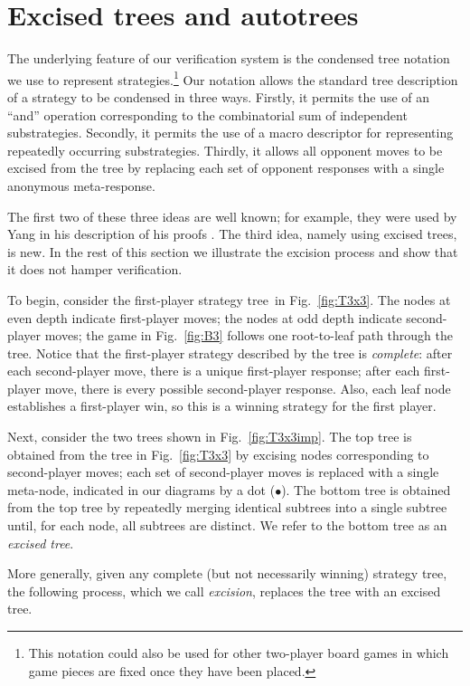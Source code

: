 \documentclass{llncs}
\def\at{autotree}
\def\stt{strategy tree}
\def\exct{excised tree}
\def\Exct{Excised tree}
\begin{document}
\section{\Exct s and \at s}
The underlying feature of our verification system is
the condensed tree notation we use to represent strategies.\footnote{This 
  notation could also be used for other two-player board games
  in which game pieces are fixed once they have been placed.}
Our notation allows the standard tree description 
of a strategy to be condensed in three ways.
Firstly, it permits the use of an ``and'' operation
corresponding to the combinatorial sum of independent substrategies.
Secondly, it permits the use of a macro descriptor for representing
repeatedly occurring substrategies.
Thirdly, it allows 
all opponent moves to be excised from the tree by replacing 
each set of opponent responses with a single anonymous meta-response.

The first two of these three ideas are well known;
for example, they were used by Yang in his description
of his proofs \cite{Yang01,Yang02a,Yang02b,Yang03}.
The third idea, namely using \exct s, is new.
In the rest of this section we
illustrate the excision process and
show that it does not hamper verification.



To begin, consider the first-player \stt\ in Fig.~\ref{fig:T3x3}.
The nodes at even depth indicate first-player moves;
the nodes at odd depth indicate second-player moves;
the game in Fig.~\ref{fig:B3} 
follows one root-to-leaf path through the tree.
Notice that the first-player strategy
described by the tree is {\it complete}:
after each second-player move,
there is a unique first-player response;
after each first-player move,
there is every possible second-player response.
Also,
each leaf node establishes a first-player win,
so this is a winning strategy for the first player.



Next, consider the two trees shown in Fig.~\ref{fig:T3x3imp}.
The top tree is obtained from the tree in Fig.~\ref{fig:T3x3}
by excising nodes corresponding to second-player moves;
each set of second-player moves is replaced with a single meta-node,
indicated in our diagrams by a dot ($\bullet$).
The bottom tree is obtained from the top tree
by repeatedly merging identical subtrees into a single subtree
until, for each node, all subtrees are distinct.
We refer to the bottom tree as an {\it \exct}.

More generally, given any complete (but not necessarily winning) strategy tree,
the following process, which we call {\it excision},
replaces the tree with an \exct.
\end{document}
